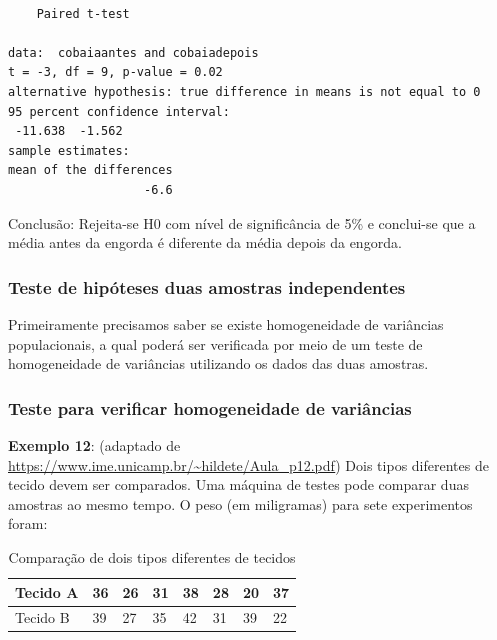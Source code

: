 \documentclass[12pt,brazil,]{book}
\begin{document}
\begin{verbatim}

    Paired t-test

data:  cobaiaantes and cobaiadepois
t = -3, df = 9, p-value = 0.02
alternative hypothesis: true difference in means is not equal to 0
95 percent confidence interval:
 -11.638  -1.562
sample estimates:
mean of the differences 
                   -6.6 
\end{verbatim}

Conclusão: Rejeita-se H0 com nível de significância de 5\% e conclui-se
que a média antes da engorda é diferente da média depois da engorda.

\hypertarget{teste-de-hipoteses-duas-amostras-independentes}{%
\subsubsection{Teste de hipóteses duas amostras
independentes}\label{teste-de-hipoteses-duas-amostras-independentes}}

Primeiramente precisamos saber se existe homogeneidade de variâncias
populacionais, a qual poderá ser verificada por meio de um teste de
homogeneidade de variâncias utilizando os dados das duas amostras.

\hypertarget{teste-para-verificar-homogeneidade-de-variancias}{%
\subsubsection{Teste para verificar homogeneidade de
variâncias}\label{teste-para-verificar-homogeneidade-de-variancias}}

\textbf{Exemplo 12}: (adaptado de
\url{https://www.ime.unicamp.br/~hildete/Aula_p12.pdf}) Dois tipos
diferentes de tecido devem ser comparados. Uma máquina de testes pode
comparar duas amostras ao mesmo tempo. O peso (em miligramas) para sete
experimentos foram:

\begin{table}

\caption{\label{tab:unnamed-chunk-112}Comparação de dois tipos diferentes de tecidos}
\centering
\begin{tabular}[t]{l|l|l|l|l|l|l|l}
\hline
Tecido A & 36 & 26 & 31 & 38 & 28 & 20 & 37\\
\hline
Tecido B & 39 & 27 & 35 & 42 & 31 & 39 & 22\\
\hline
\end{tabular}
\end{table}
\end{document}
